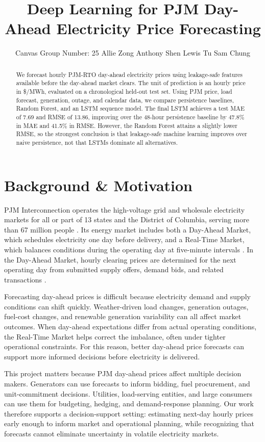 \documentclass{article}
\title{Deep Learning for PJM Day-Ahead Electricity Price Forecasting}
\author{%
  Canvas Group Number: 25 
  \AND
  Allie Zong \And 
  Anthony Shen \And
  Lewis Tu \And
  Sam Chung
}
\begin{document}
\maketitle
\begin{abstract}
We forecast hourly PJM-RTO day-ahead electricity prices using leakage-safe features available before the day-ahead market clears. The unit of prediction is an hourly price in \$/MWh, evaluated on a chronological held-out test set. Using PJM price, load forecast, generation, outage, and calendar data, we compare persistence baselines, Random Forest, and an LSTM sequence model. The final LSTM achieves a test MAE of 7.69 and RMSE of 13.86, improving over the 48-hour persistence baseline by 47.8\% in MAE and 41.5\% in RMSE. However, the Random Forest attains a slightly lower RMSE, so the strongest conclusion is that leakage-safe machine learning improves over naive persistence, not that LSTMs dominate all alternatives.
\end{abstract}

\section{Background \& Motivation}

PJM Interconnection operates the high-voltage grid and wholesale electricity markets for all or part of 13 states and the District of Columbia, serving more than 67 million people \cite{pjm_who_we_are,ferc_pjm}. Its energy market includes both a Day-Ahead Market, which schedules electricity one day before delivery, and a Real-Time Market, which balances conditions during the operating day at five-minute intervals \cite{pjm_energy_market}. In the Day-Ahead Market, hourly clearing prices are determined for the next operating day from submitted supply offers, demand bids, and related transactions \cite{pjm_manual11}.

Forecasting day-ahead prices is difficult because electricity demand and supply conditions can shift quickly. Weather-driven load changes, generation outages, fuel-cost changes, and renewable generation variability can all affect market outcomes. When day-ahead expectations differ from actual operating conditions, the Real-Time Market helps correct the imbalance, often under tighter operational constraints. For this reason, better day-ahead price forecasts can support more informed decisions before electricity is delivered.

This project matters because PJM day-ahead prices affect multiple decision makers. Generators can use forecasts to inform bidding, fuel procurement, and unit-commitment decisions. Utilities, load-serving entities, and large consumers can use them for budgeting, hedging, and demand-response planning. Our work therefore supports a decision-support setting: estimating next-day hourly prices early enough to inform market and operational planning, while recognizing that forecasts cannot eliminate uncertainty in volatile electricity markets.
\end{document}
